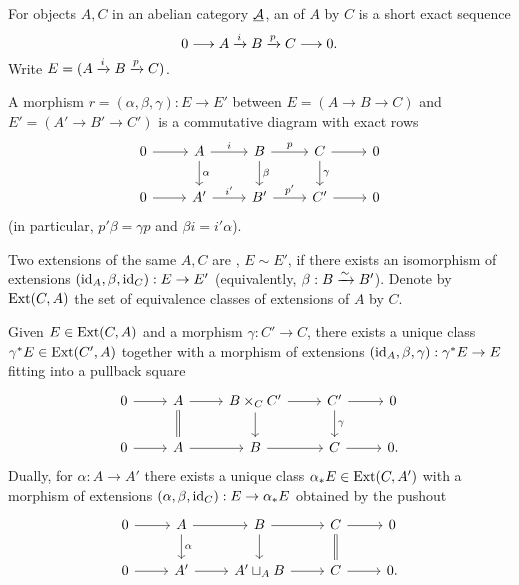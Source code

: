\begin{definitions*}
	\item For objects \( A,C \) in an abelian category \( \underline{\mathcal{A}} \), an  of \( A \) by \( C \) is a short exact sequence
		\[
			0 \longrightarrow A \xrightarrow{i} B \xrightarrow{p} C \longrightarrow 0.
		\]
		Write \( E=(A\xrightarrow{i}B\xrightarrow{p}C) \).

	\item A morphism \( r=(\alpha,\beta,\gamma): E\to E' \) between
		\( E=(A\to B\to C) \) and \( E'=(A'\to B'\to C') \) is a commutative diagram with exact rows
		\[
			\begin{tikzcd}
				0 \arrow[r] & A \arrow[r,"i"] \arrow[d,"\alpha"] & B \arrow[r,"p"] \arrow[d,"\beta"] & C \arrow[r] \arrow[d,"\gamma"] & 0 \\
				0 \arrow[r] & A' \arrow[r,"i'"] & B' \arrow[r,"p'"] & C' \arrow[r] & 0
			\end{tikzcd}
		\]
		(in particular, \( p'\beta=\gamma p \) and \( \beta i = i'\alpha \)).

	\item Two extensions of the same \( A,C \) are , \( E\sim E' \), if there exists an isomorphism of extensions \( (\mathrm{id}_A,\beta,\mathrm{id}_C):E\to E' \) (equivalently, \( \beta: B\xrightarrow{\sim} B' \)). Denote by \( \operatorname{Ext}(C,A) \) the set of equivalence classes of extensions of \( A \) by \( C \).
\end{definitions*}


Given \( E\in\operatorname{Ext}(C,A) \) and a morphism \( \gamma: C'\to C \), there exists a unique class \( \gamma^{*}E\in\operatorname{Ext}(C',A) \) together with a morphism of extensions \( (\mathrm{id}_A,\beta,\gamma): \gamma^{*}E \to E \) fitting into a pullback square
\[
	\begin{tikzcd}
		0 \arrow[r] & A \arrow[r] \arrow[d,equals] & B\times_{C} C' \arrow[r] \arrow[d] & C' \arrow[r] \arrow[d,"\gamma"] & 0 \\
		0 \arrow[r] & A \arrow[r] & B \arrow[r] & C \arrow[r] & 0.
	\end{tikzcd}
\]
Dually, for \( \alpha: A\to A' \) there exists a unique class \( \alpha_{*}E\in\operatorname{Ext}(C,A') \) with a morphism of extensions \( (\alpha,\beta,\mathrm{id}_C): E\to \alpha_{*}E \) obtained by the pushout
\[
	\begin{tikzcd}
		0 \arrow[r] & A \arrow[r] \arrow[d,"\alpha"] & B \arrow[r] \arrow[d] & C \arrow[r] \arrow[d,equals] & 0 \\
		0 \arrow[r] & A' \arrow[r] & A'\sqcup_{A} B \arrow[r] & C \arrow[r] & 0 .
	\end{tikzcd}
\]

